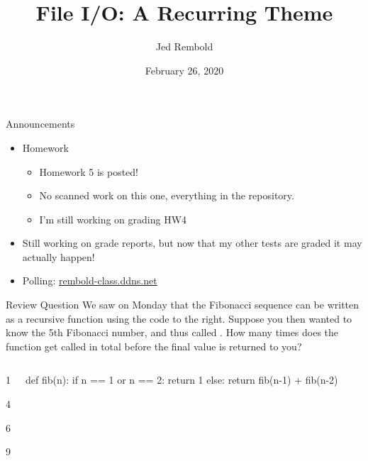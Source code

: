 \documentclass[pdf, aspectratio=169, 12pt]{beamer}
\title{File I/O: A Recurring Theme}
\author{Jed Rembold}
\date{February 26, 2020}
\begin{document}
\begin{frame}{Announcements}
	\begin{itemize}
		\item Homework
			\begin{itemize}
				\item Homework 5 is posted!
				\item No scanned work on this one, everything in the repository.
				\item I'm still working on grading HW4
			\end{itemize}
		\item Still working on grade reports, but now that my other tests are graded it may actually happen!
		\item Polling: \url{rembold-class.ddns.net}
	\end{itemize}
\end{frame}

\begin{frame}[fragile]{Review Question}
		We saw on Monday that the Fibonacci sequence can be written as a recursive function using the code to the right. Suppose you then wanted to know the 5th Fibonacci number, and thus called . How many times does the  function get called in total before the final value is returned to you?
	\begin{columns}
		\begin{poll}
		\item 1
		\item 4
		\item 6
		\item 9
		\end{poll}
		\begin{pythoncode}[tabsize=2]
			def fib(n):
				if n == 1 or n == 2:
					return 1
				else:
					return fib(n-1) + fib(n-2)
		\end{pythoncode}
	\end{columns}
\end{frame}
\end{document}
